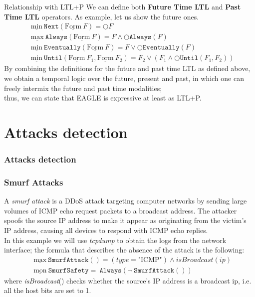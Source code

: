 \documentclass[aspectratio=169,t,xcolor=table]{beamer}
\begin{document}
\begin{frame}{Relationship with LTL+P}
    We can define both \textbf{Future Time LTL} and \textbf{Past Time LTL} operators. As example, let us show the future ones.
    \begin{align*}
        & \underline{\text{min}}\ \mathtt{Next}(\underline{\text{Form}}\ F) = \bigcirc F \\
        & \underline{\text{max}}\ \mathtt{Always}(\underline{\text{Form}}\ F) = F \land \bigcirc \mathtt{Always}(F) \\
        & \underline{\text{min}}\ \mathtt{Eventually}(\underline{\text{Form}}\ F) = F \lor \bigcirc \mathtt{Eventually}(F) \\
        & \underline{\text{min}}\ \mathtt{Until}(\underline{\text{Form}}\ F_1, \underline{\text{Form}}\ F_2) = F_2 \lor (F_1 \land \bigcirc \mathtt{Until}(F_1,F_2))
    \end{align*}
    By combining the definitions for the future and past time LTL as defined above, we obtain a temporal logic over the future, present and past, in which one can freely intermix the future and past time modalities;\\thus, we can state that EAGLE is expressive at least as LTL+P.

\end{frame}

\section{Attacks detection}
\begin{frame}{}
    \frametitle{Attacks detection}
\end{frame}

\begin{frame}
    \frametitle{Smurf Attacks}
    A \textit{smurf attack} is a DDoS attack targeting computer networks by sending large volumes of ICMP echo request packets to a broadcast address. The attacker spoofs the source IP address to make it appear as originating from the victim's IP address, causing all devices to respond with ICMP echo replies.\\
    \vspace{2.5mm}
    In this example we will use \textit{tcpdump} to obtain the logs from the network interface; the formula that describes the absence of the attack is the following:
    \begin{align*}
        & \underline{\text{max}}\ \mathtt{SmurfAttack()} = (type = \text{"ICMP"})\land isBroadcast(ip) \\
        & \underline{\text{mon}}\ \mathtt{SmurfSafety} =\ \mathtt{Always}(\neg\ \mathtt{SmurfAttack()}) 
    \end{align*}
    where \textit{isBroadcast}() checks whether the source’s IP address is a broadcast ip, i.e. all the host bits are set to 1.
\end{frame}
\end{document}
